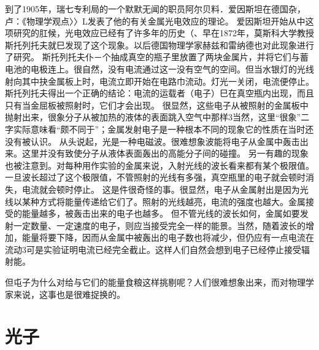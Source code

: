 到了1905年，瑞七专利局的一个默默无闻的职员阿尔贝料．爱因斯坦在德国杂，卢：《物理学观点〉〉L发表了他的有关金属光电效应的理论。
爱因斯坦开始从中这项研究的肛候，光电效应已经有了许多年的历史（、早在1872年，莫斯科大学教授斯托列托夫就巳发现了这个现象。以后德国物理学家赫兹和雷纳德也对此现象进行了研究。
斯托列托夫仆－个抽成真空的瓶子里放置了两块金属片，并将它们与蓄电池的电极连上。很自然，没有电流通过这一没有空气的空间。但当水银灯的光线射向其中抉金属板上时，电流立即开始在电路巾流动。灯光一关闭，电流便停止。
斯托列托夫得出一个正确的结论：电流的运载者（电子）巳在真空瓶内出现，而且只有当金屈板被照射时，它们才会出现。
很显然，这些电子从被照射的金属板中抛射出来，很象分子从被加热的液体的表面跳入空气中那样3当然，这里“很象”二字实际意味看“颇不同于”；金属发射电子是一种根本不同的现象它的性质在当时还没有被认识。
从头说起，光是一种电磁波。很难想象波能将电子从金属中轰击出来。这里并没有致使分子从液体表面轰出的高能分子间的碰撞。
另一有趣的现象也被注意到。对每种用作实验的金属来说，入射光线的波长看来都有某个极限值。一旦波长超过了这个极限值，不管照射的光线有多强，真空瓶里的电子就会顿时消失，电流就会顿时停止。
这是件很奇怪的事。很显然，电子从金属射出是因为光线以某种方式将能量传递给它们了。照射的光线越亮，电流的强度也越大。金属接受的能量越多，被轰击出来的电子也越多。
但不管光线的波长如何，金属如要发射一定数量、一定速度的电子，则应当接受完全一样的能景。当然，随着波长的增加，能量将要下降，因而从金属中被轰出的电子数也将减少，但仍应有一点电流在流动3可是实验证明电流已经完全截止。这样人们自然会想到电子已经停止接受辐射能。

但屯子为什么对给与它们的能量食粮这样挑剔呢？人们很难想象出来，而对物理学家来说，这事也是很难捉换的。

\section{光子}

